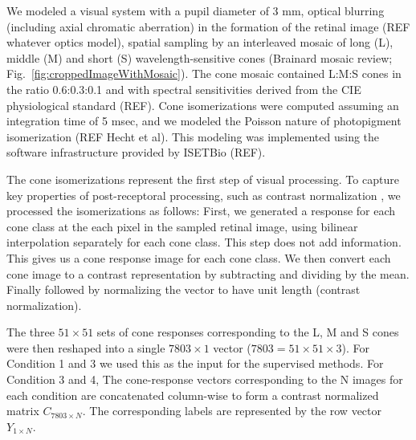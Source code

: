 \documentclass{jov}
\begin{document}
We modeled a visual system with a pupil diameter of 3 mm, optical blurring (including axial chromatic aberration) in the formation of the retinal image (REF whatever optics model), spatial sampling by an interleaved mosaic of long (L), middle (M)  and short (S) wavelength-sensitive cones (Brainard mosaic review; Fig.~\ref{fig:croppedImageWithMosaic}). The cone mosaic contained  L:M:S cones in the ratio 0.6:0.3:0.1 and with spectral sensitivities derived from the CIE physiological standard (REF).
Cone isomerizations were computed assuming an integration time of 5 msec, and we modeled the Poisson nature of photopigment isomerization (REF Hecht et al). This modeling was implemented using the software infrastructure provided by ISETBio (REF).

The cone isomerizations represent the first step of visual processing.
To capture key properties of post-receptoral processing, such as contrast normalization \cite{heeger1992normalization,albrecht1991motion,carandini2012normalization},
we processed the isomerizations as follows:
First, we generated a response for each cone class at the each pixel in the sampled retinal image, using bilinear interpolation separately for each cone class.
This step does not add information.
This gives us a cone response image for each cone class.
We then convert each cone image to a contrast representation by subtracting and dividing by the mean.
Finally  followed by normalizing the vector to have unit length (contrast normalization).


The three $51 \times 51$ sets of cone responses corresponding to the L, M and S cones were then reshaped into a single $7803 \times 1$ vector ($7803 = 51 \times 51 \times 3$). For Condition 1 and 3 we used this as the input for the supervised methods. For Condition 3 and 4, 
The cone-response vectors corresponding to the N images for each condition are concatenated column-wise to form a contrast normalized matrix $C_{7803\times N}$. The corresponding labels are represented by the row vector $Y_{1\times N}$.


\end{document}
